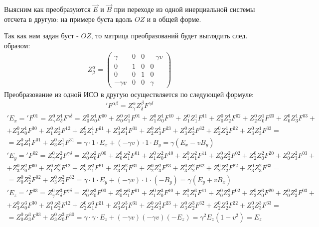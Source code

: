 \documentclass[__main__.tex]{subfiles}
\begin{document}
Выясним как преобразуются $\displaystyle \vec{E}$ и $\displaystyle \vec{B}$  при переходе из одной инерциальной системы отсчета в другую: на примере буста вдоль $OZ$ и в общей форме.

Так как нам задан буст - $OZ$, то матрица преобразований будет выглядить след. образом:
\begin{gather*}
	Z^\alpha_\beta = \begin{pmatrix}
	\gamma & 0 & 0 & -\gamma v \\
	0 & 1 & 0 & 0 \\         
	0 & 0 & 1 & 0 \\
	-\gamma v & 0 & 0 & \gamma
	\end{pmatrix}
\end{gather*}
Преобразование из одной ИСО в другую осуществляется по следующей формуле:
\begin{gather*}
'F^{\alpha \beta} = Z^\alpha_\gamma Z^\beta_\delta F^{\gamma \delta}
\end{gather*}
\begin{gather*}
'E_x ='F^{01} = Z^0_\gamma Z^1_\delta F^{\gamma \delta} = Z^0_0 Z^1_0 F^{00}+Z^0_0 Z^1_1 F^{01}+Z^0_1 Z^1_0 F^{10}+Z^0_1 Z^1_1 F^{11}+Z^0_0 Z^1_2 F^{02}+Z^0_2 Z^1_0 F^{20}+Z^0_0 Z^1_3 F^{03}+\\+Z^0_3 Z^1_0 F^{30}+Z^0_1 Z^1_2 F^{12}+Z^0_2 Z^1_1 F^{21}+Z^0_3 Z^1_1 F^{31}+Z^0_2 Z^1_3 F^{23}+Z^0_3 Z^1_2 F^{32}+Z^0_2 Z^1_2 F^{22}+Z^0_3 Z^1_3 F^{33}=\\
=Z^0_0 Z^1_1 F^{01}+Z^0_3 Z^1_1 F^{31}=\gamma \cdot 1 \cdot E_x+(-\gamma v)\cdot 1 \cdot B_y = \gamma (E_x-vB_y)
\end{gather*}
\begin{gather*}
'E_y ='F^{02} = Z^0_\gamma Z^2_\delta F^{\gamma \delta} = Z^0_0 Z^2_0 F^{00}+Z^0_0 Z^2_1 F^{01}+Z^0_1 Z^2_0 F^{10}+Z^0_1 Z^2_1 F^{11}+Z^0_0 Z^2_2 F^{02}+Z^0_2 Z^2_0 F^{20}+Z^0_0 Z^2_3 F^{03}+\\+Z^0_3 Z^2_0 F^{30}+Z^0_1 Z^2_2 F^{12}+Z^0_2 Z^2_1 F^{21}+Z^0_3 Z^2_1 F^{31}+Z^0_2 Z^2_3 F^{23}+Z^0_3 Z^2_2 F^{32}+Z^0_2 Z^2_2 F^{22}+Z^0_3 Z^2_3 F^{33}=\\
=Z^0_0 Z^2_2 F^{02}+Z^0_3 Z^2_2 F^{32}=\gamma \cdot 1 \cdot E_y+(-\gamma v)\cdot 1 \cdot (-B_y) = \gamma (E_y+vB_x)
\end{gather*}
\begin{gather*}
'E_z ='F^{03} = Z^0_\gamma Z^3_\delta F^{\gamma \delta} = Z^0_0 Z^3_0 F^{00}+Z^0_0 Z^3_1 F^{01}+Z^0_1 Z^3_0 F^{10}+Z^0_1 Z^3_1 F^{11}+Z^0_0 Z^3_2 F^{02}+Z^0_2 Z^3_0 F^{20}+Z^0_0 Z^3_3 F^{03}+\\+Z^0_3 Z^3_0 F^{30}+Z^0_1 Z^3_2 F^{12}+Z^0_2 Z^3_1 F^{21}+Z^0_3 Z^3_1 F^{31}+Z^0_2 Z^3_3 F^{23}+Z^0_3 Z^3_2 F^{32}+Z^0_2 Z^3_2 F^{22}+Z^0_3 Z^3_3 F^{33}=\\
=Z^0_0 Z^3_3 F^{03}+Z^0_3 Z^3_0 F^{30}=\gamma \cdot \gamma \cdot E_z+(-\gamma v)(-\gamma v)(-E_z) = \gamma ^2 E_z(1-v^2) = E_z
\end{gather*}
\end{document}
